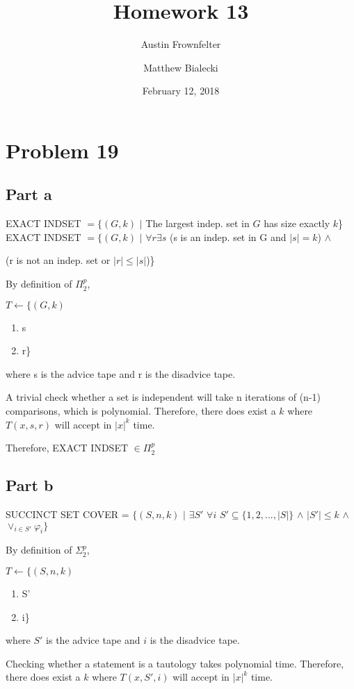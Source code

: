 \documentclass{article}
\title{Homework 13}
\author{Austin Frownfelter \and Matthew Bialecki}
\date{February 12, 2018}
\begin{document}
\maketitle

\section{Problem 19}
\subsection{Part a}
EXACT INDSET $= \{(G,k)$ $|$ The largest indep. set in $G$ has size exactly $k$\}
\\
EXACT INDSET $= \{(G,k)$ $|$ $\forall r \exists s $ (s is an indep. set in G and $|s|=k$) $\land$ 

 (r is not an indep. set or $|r| \leq |s|$)\}

\bigskip
By definition of $\Pi_{2}^{p}$, 

$T \leftarrow \{(G,k)$ \begin{enumerate}[label=]
\item s
\item r\}
\end{enumerate}

where s is the advice tape and r is the disadvice tape.

A trivial check whether a set is independent will take n iterations of (n-1) comparisons, which is polynomial.  Therefore, there does exist a $k$ where $T(x,s,r)$ will accept in $|x|^{k}$ time.

Therefore, EXACT INDSET $\in \Pi_{2}^{p}$


\subsection{Part b}
SUCCINCT SET COVER = $\{(S,n,k)$ $|$ $\exists S'$ $ \forall i$  $S'\subseteq \{1,2,...,|S|\} $ $\land $ $|S'|\leq k$ $\land$  $\lor_{i\in S'} \varphi_{i}\}$

\bigskip
By definition of $\Sigma_{2}^{p}$, 

$T \leftarrow \{(S,n,k)$ \begin{enumerate}[label=]
\item S'
\item i\}
\end{enumerate}

where $S'$ is the advice tape and $i$ is the disadvice tape.

Checking whether a statement is a tautology takes polynomial time.  Therefore, there does exist a $k$ where $T(x,S',i)$ will accept in $|x|^{k}$ time.
\end{document}

